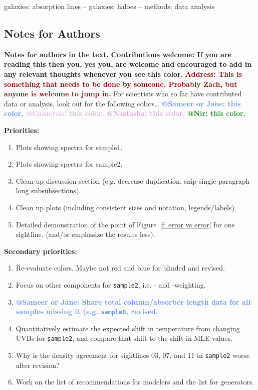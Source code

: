 \documentclass[fleqn,usenatbib]{mnras}
\makeatletter
\newcommand{\thoughts}[1]{\textcolor{BurntOrange}{\textbf{Contributions welcome: #1}}}
\newcommand{\todo}[1]{\textcolor{Maroon}{\textbf{Address: #1}}}
\newcommand{\atsameer}[1]{\textcolor{CornflowerBlue}{\textbf{@Sameer or Jane: #1}}}
\newcommand{\atcameron}[1]{\textcolor{Thistle}{\textbf{@Cameron: #1}}}
\newcommand{\atnastasha}[1]{\textcolor{Plum}{\textbf{@Nastasha: #1}}}
\newcommand{\atnir}[1]{\textcolor{ForestGreen}{\textbf{@Nir: #1}}}
\makeatother
\begin{document}
\begin{keywords}
galaxies: absorption lines -- galaxies: haloes -- methods: data analysis
\end{keywords}



\subsection{Notes for Authors}

\textbf{Notes for authors in the text.}
\thoughts{If you are reading this then you, yes you, are welcome and encouraged to add in any relevant thoughts whenever you see this color.}
\todo{This is something that needs to be done by someone. Probably Zach, but anyone is welcome to jump in.}
For scientists who so far have contributed data or analysis, look out for the following colors\ldots
\atsameer{this color.}
\atcameron{this color.}
\atnastasha{this color.}
\atnir{this color.}

\textbf{Priorities:}
\begin{enumerate}
    \item Plots showing spectra for sample1.
    \item Plots showing spectra for sample2.
    \item Clean up discussion section (e.g. decrease duplication, snip single-paragraph-long subsubsections).
    \item Clean up plots (including consistent sizes and notation, legends/labels).
    \item Detailed demonstration of the point of Figure~\ref{f: error vs error} for one sightline. (and/or emphasize the results less).
\end{enumerate}

\textbf{Secondary priorities:}
\begin{enumerate}
    \item Re-evaluate colors. Maybe not red and blue for blinded and revised.
    \item Focus on other components for \texttt{sample2}, i.e. - and -weighting.
    \item \atsameer{Share total column/absorber length data for all samples missing it (e.g. \texttt{sample0}, revised.}
    \item Quantitatively estimate the expected shift in temperature from changing UVBs for \texttt{sample2}, and compare that shift to the shift in MLE values.
    \item Why is the density agreement for sightlines 03, 07, and 11 in \texttt{sample2} worse after revision?
    \item Work on the list of recommendations for modelers and the list for generators.
\end{enumerate}
\end{document}
